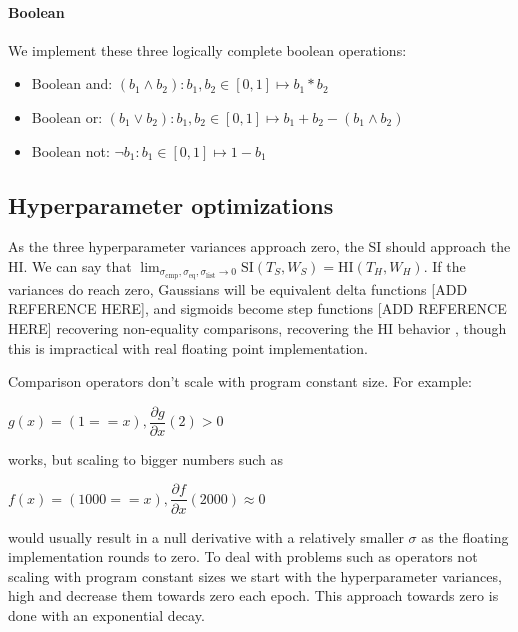 \documentclass{article}
\begin{document}
\paragraph{Boolean} We implement these three logically complete boolean operations:
\begin{itemize}
  \item Boolean and: $(b_1 \land b_2): b_1, b_2 \in [0, 1] \mapsto b_1 * b_2$
  \item Boolean or: $(b_1 \lor b_2): b_1, b_2 \in [0, 1] \mapsto b_1 + b_2 - (b_1 \land b_2)$
  \item Boolean not: $\neg b_1: b_1 \in [0, 1] \mapsto 1 - b_1$\\
\end{itemize}

\subsection*{Hyperparameter optimizations}
As the three hyperparameter variances approach zero, the SI should approach the HI. We can say that $\lim_{\sigma_{\text{cmp}}, \sigma_{\text{eq}}, \sigma_{\text{list}} \rightarrow 0} \text{SI}(T_S, W_S) = \text{HI}(T_H, W_H)$. If the variances do reach zero, Gaussians will be equivalent delta functions [ADD REFERENCE HERE], and sigmoids become step functions [ADD REFERENCE HERE] recovering non-equality comparisons, recovering the HI behavior , though this is impractical with real floating point implementation.

Comparison operators don't scale with program constant size. For example:
\begin{center}
  $g(x) = (1 == x), \dfrac{\partial g}{\partial x} (2) > 0$
\end{center}
works, but scaling to bigger numbers such as
\begin{center}
  $f(x) = (1000 == x), \dfrac{\partial f}{\partial x} (2000) \approx 0$\\
\end{center}
would usually result in a null derivative with a relatively smaller $\sigma$ as the floating implementation rounds to zero. To deal with problems such as operators not scaling with program constant sizes we start with the hyperparameter variances, high and decrease them towards zero each epoch. This approach towards zero is done with an exponential decay.\\

\end{document}
